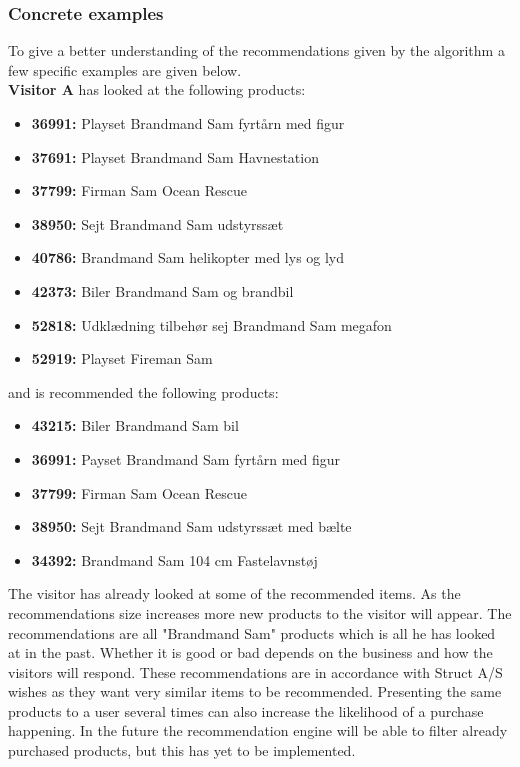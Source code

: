 \subsubsection{Concrete examples}
To give a better understanding of the recommendations given by the algorithm a few specific examples are given below. \\

\textbf{Visitor A} has looked at the following products:
\begin{itemize}
\item \textbf{36991: }Playset Brandmand Sam fyrtårn med figur
\item \textbf{37691: }Playset Brandmand Sam Havnestation
\item \textbf{37799: }Firman Sam Ocean Rescue
\item \textbf{38950: }Sejt Brandmand Sam udstyrssæt
\item \textbf{40786: }Brandmand Sam helikopter med lys og lyd
\item \textbf{42373: }Biler Brandmand Sam og brandbil
\item \textbf{52818: }Udklædning tilbehør sej Brandmand Sam megafon
\item \textbf{52919: }Playset Fireman Sam
\end{itemize}
and is recommended the following products:
\begin{itemize}
\item \textbf{43215: }Biler Brandmand Sam bil
\item \textbf{36991: }Payset Brandmand Sam fyrtårn med figur
\item \textbf{37799: }Firman Sam Ocean Rescue
\item \textbf{38950: }Sejt Brandmand Sam udstyrssæt med bælte
\item \textbf{34392:} Brandmand Sam 104 cm Fastelavnstøj
\end{itemize}

The visitor has already looked at some of the recommended items. As the recommendations size increases more new products to the visitor will appear. The recommendations are all "Brandmand Sam" products which is all he has looked at in the past. Whether it is good or bad depends on the business and how the visitors will respond. These recommendations are in accordance with Struct A/S wishes as they want very similar items to be recommended. Presenting the same products to a user several times can also increase the likelihood of a purchase happening. In the future the recommendation engine will be able to filter already purchased products, but this has yet to be implemented. \\\\

